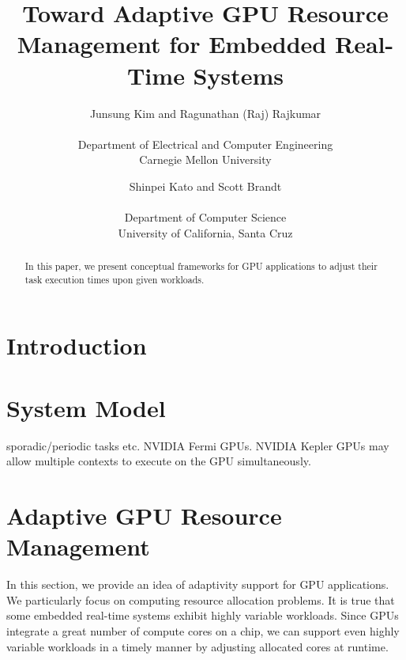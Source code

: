 \documentclass[times, 10pt, twocolumn]{article}
\begin{document}
\title{
Toward Adaptive GPU Resource Management for Embedded Real-Time Systems
}

\author {
Junsung Kim and Ragunathan (Raj) Rajkumar\\
\\
Department of Electrical and Computer Engineering\\
Carnegie Mellon University
\and
Shinpei Kato and Scott Brandt\\
\\
Department of Computer Science\\
University of California, Santa Cruz
}

\maketitle

\thispagestyle{empty}

\begin{abstract}
 In this paper, we present conceptual frameworks for GPU applications to
 adjust their task execution times upon given workloads.
\end{abstract}

\section{Introduction}
\label{sec:introduction}

\section{System Model}
\label{sec:system_model}

sporadic/periodic tasks etc.
NVIDIA Fermi GPUs.
NVIDIA Kepler GPUs may allow multiple contexts to execute on the GPU
simultaneously.

\section{Adaptive GPU Resource Management}
\label{sec:adaptivity_support}

In this section, we provide an idea of adaptivity support for GPU
applications.
We particularly focus on computing resource allocation problems.
It is true that some embedded real-time systems exhibit highly variable
workloads.
Since GPUs integrate a great number of compute cores on a chip, we can
support even highly variable workloads in a timely manner by adjusting
allocated cores at runtime.
\end{document}
